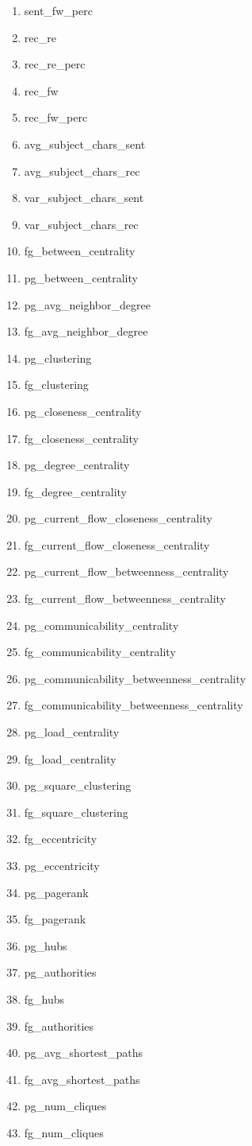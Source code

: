\documentclass[12pt]{report}
\begin{document}
\begin{enumerate}
	\item sent\_fw\_perc
	\item rec\_re
	\item rec\_re\_perc
	\item rec\_fw
	\item rec\_fw\_perc
	\item avg\_subject\_chars\_sent
	\item avg\_subject\_chars\_rec
	\item var\_subject\_chars\_sent
	\item var\_subject\_chars\_rec
	\item fg\_between\_centrality
	\item pg\_between\_centrality
	\item pg\_avg\_neighbor\_degree
	\item fg\_avg\_neighbor\_degree
	\item pg\_clustering
	\item fg\_clustering
	\item pg\_closeness\_centrality
	\item fg\_closeness\_centrality
	\item pg\_degree\_centrality
	\item fg\_degree\_centrality
	\item pg\_current\_flow\_closeness\_centrality
    \item fg\_current\_flow\_closeness\_centrality
	\item pg\_current\_flow\_betweenness\_centrality
	\item fg\_current\_flow\_betweenness\_centrality
	\item pg\_communicability\_centrality
	\item fg\_communicability\_centrality
	\item pg\_communicability\_betweenness\_centrality
	\item fg\_communicability\_betweenness\_centrality
	\item pg\_load\_centrality
	\item fg\_load\_centrality
	\item pg\_square\_clustering
	\item fg\_square\_clustering
	\item fg\_eccentricity
	\item pg\_eccentricity
	\item pg\_pagerank
	\item fg\_pagerank
	\item pg\_hubs
	\item pg\_authorities
	\item fg\_hubs
	\item fg\_authorities
	\item pg\_avg\_shortest\_paths
	\item fg\_avg\_shortest\_paths
	\item pg\_num\_cliques
	\item fg\_num\_cliques
\end{enumerate}
\end{document}
